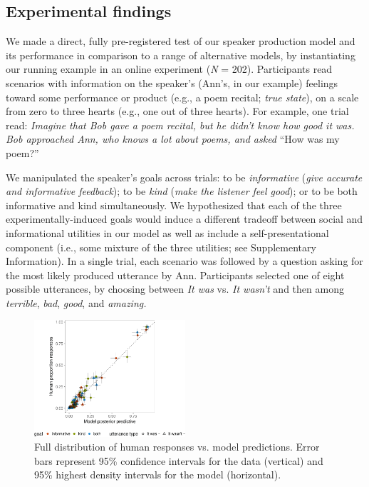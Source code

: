 \documentclass[9pt,twocolumn,twoside,lineno]{main_class_file}
\begin{document}
\subsection*{Experimental findings}
We made a direct, fully pre-registered test of our speaker production model and its performance in comparison to a range of alternative models, by instantiating our running example in an online experiment (\emph{N} = 202).
Participants read scenarios with information on the speaker's (Ann's,
in our example) feelings toward some performance or product (e.g., a poem
recital; \emph{true state}), on a scale from zero to three hearts (e.g.,
one out of three hearts). For example, one trial read: \emph{Imagine
that Bob gave a poem recital, but he didn't know how good it was. Bob
approached Ann, who knows a lot about poems, and asked} ``How was my poem?''


We manipulated the speaker's goals across trials: to be
\emph{informative} (\emph{give accurate and informative feedback});
to be \emph{kind} (\emph{make the listener feel good}); or to be
both informative and kind simultaneously. We hypothesized that
each of the three experimentally-induced goals would induce a different tradeoff between social and informational
utilities in our model as well as include a self-presentational component (i.e., some mixture of the three utilities; see Supplementary Information). In a single
trial, each scenario was followed by a question asking for the most
likely produced utterance by Ann. Participants selected one of eight possible
utterances, by choosing between \emph{It was} vs. \emph{It wasn't} and
then among \emph{terrible}, \emph{bad}, \emph{good}, and \emph{amazing.}

\begin{figure}[!h]
\includegraphics[width=0.5\textwidth]{fig/variance-1} \caption{Full distribution of human responses vs. model predictions. Error bars represent 95\% confidence intervals for the data (vertical) and 95\% highest density intervals for the model (horizontal).}\label{fig:variance}
\end{figure}
\end{document}
